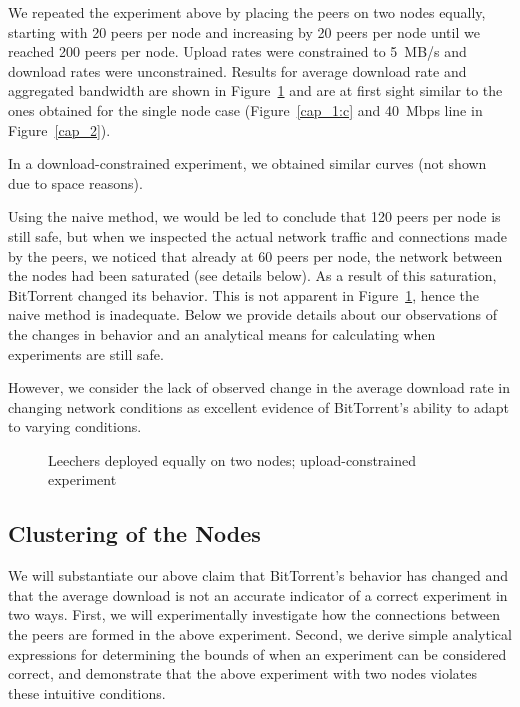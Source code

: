 \documentclass[10pt,letterpaper,twocolumn]{article}
\begin{document}
We repeated the experiment above by placing the peers on two nodes
equally, starting with 20 peers per node and increasing by 20 peers
per node until we reached 200 peers per node. Upload rates were
constrained to 5~MB/s and download rates were unconstrained. Results
for average download rate and aggregated bandwidth are shown in
Figure~\ref{cap_4} and are at first sight similar to the ones obtained
for the single node case (Figure~\ref{cap_1:c} and 40~Mbps line in
Figure~\ref{cap_2}). 

In a download-constrained experiment, we obtained similar curves (not
shown due to space reasons).

Using the naive method, we would be led to conclude that 120 peers per
node is still safe, but when we inspected the actual network traffic
and connections made by the peers, we noticed that already at 60 peers
per node, the network between the nodes had been saturated (see
details below). As a result of this saturation, BitTorrent changed its
behavior. This is not apparent in Figure~\ref{cap_4}, hence the naive
method is inadequate. Below we provide details about our observations
of the changes in behavior and an analytical means for calculating
when experiments are still safe.

However, we consider the lack of observed change in the average
download rate in changing network conditions as excellent evidence of
BitTorrent's ability to adapt to varying conditions. 





\begin{figure}[!tb] 
  \centering 
  \caption{Leechers deployed equally on two nodes; upload-constrained experiment}
  \label{cap_4} 
\end{figure}


\subsection{Clustering of the Nodes}
\label{cluster_nodes}

We will substantiate our above claim that BitTorrent's behavior has
changed and that the average download is not an accurate indicator of
a correct experiment in two ways. First, we will experimentally
investigate how the connections between the peers are formed in the
above experiment. Second, we derive simple analytical expressions for
determining the bounds of when an experiment can be considered
correct, and demonstrate that the above experiment with two nodes
violates these intuitive conditions.
\end{document}
